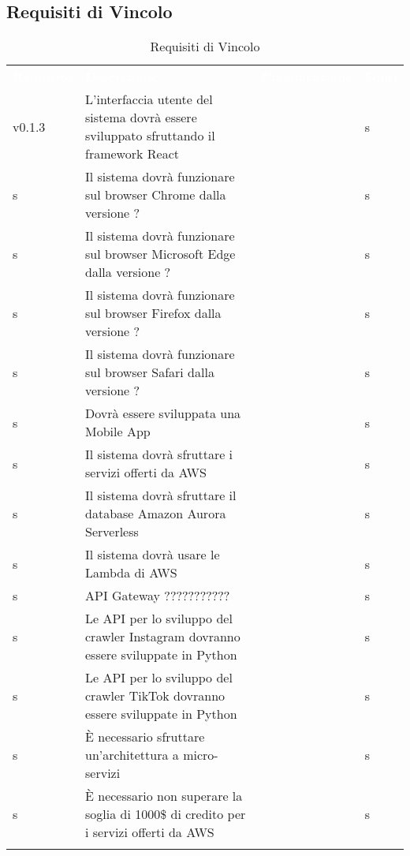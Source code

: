 \subsection{Requisiti di Vincolo}


\renewcommand{\arraystretch}{1.5}
\begin{longtable}{ m{}<{\centering}  m{}<{\centering}  m{}<{\centering}  m{}<{\centering}}
	\rowcolor{darkblue}
	\textcolor{white}{\textbf{Requisito}} &\textcolor{white}{\textbf{Descrizione}}& \textcolor{white}{\textbf{Classificazione}} & \textcolor{white}{\textbf{Fonti}}\\ 

	 v0.1.3 & L’interfaccia utente del sistema dovrà essere sviluppato sfruttando il framework React & \Ob & s\\	

	\rowcolor{gray!25} s & Il sistema dovrà funzionare sul browser Chrome dalla versione ? & \Ob & s\\	
	 
	 s & Il sistema dovrà funzionare sul browser Microsoft Edge dalla versione ? & \Ob & s\\	

	\rowcolor{gray!25} s & Il sistema dovrà funzionare sul browser Firefox dalla versione ? & \Ob & s\\	
	 
	 s & Il sistema dovrà funzionare sul browser Safari dalla versione ? & \Ob & s\\	
	 
	\rowcolor{gray!25} s & Dovrà essere sviluppata una Mobile App & \Fa & s\\	
	 
	 s & Il sistema dovrà sfruttare i servizi offerti da AWS & \Ob & s\\	
	 
	\rowcolor{gray!25} s & Il sistema dovrà sfruttare il database Amazon Aurora Serverless & \De & s\\
	
	 s & Il sistema dovrà usare le Lambda di AWS & \Ob & s\\	
	 
	\rowcolor{gray!25} s & API Gateway ??????????? & \De & s\\	 

	 s & Le API per lo sviluppo del crawler Instagram dovranno essere sviluppate in Python & \De & s\\	
	 
	\rowcolor{gray!25} s & Le API per lo sviluppo del crawler TikTok dovranno essere sviluppate in Python & \De & s\\	
	 
	 s & È necessario sfruttare un’architettura a micro-servizi & \Ob & s\\	
	 
	\rowcolor{gray!25} s & È necessario non superare la soglia di 1000\$ di credito per i servizi offerti da AWS & \Ob & s\\	
	
	\caption{Requisiti di Vincolo}
\end{longtable}

\pagebreak